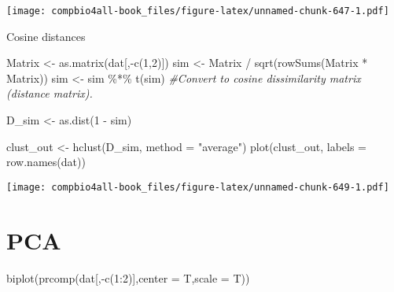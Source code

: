 \documentclass[
]{book}
\newenvironment{Shaded}{\begin{snugshade}}{\end{snugshade}}
\newcommand{\AttributeTok}[1]{\textcolor[rgb]{0.77,0.63,0.00}{#1}}
\newcommand{\CommentTok}[1]{\textcolor[rgb]{0.56,0.35,0.01}{\textit{#1}}}
\newcommand{\DecValTok}[1]{\textcolor[rgb]{0.00,0.00,0.81}{#1}}
\newcommand{\FunctionTok}[1]{\textcolor[rgb]{0.00,0.00,0.00}{#1}}
\newcommand{\NormalTok}[1]{#1}
\newcommand{\OtherTok}[1]{\textcolor[rgb]{0.56,0.35,0.01}{#1}}
\newcommand{\SpecialCharTok}[1]{\textcolor[rgb]{0.00,0.00,0.00}{#1}}
\newcommand{\StringTok}[1]{\textcolor[rgb]{0.31,0.60,0.02}{#1}}
\begin{document}
\texttt{[image: compbio4all-book\_files/figure-latex/unnamed-chunk-647-1.pdf]}

Cosine distances

\begin{Shaded}
\begin{Highlighting}[]
\NormalTok{Matrix }\OtherTok{\textless{}{-}} \FunctionTok{as.matrix}\NormalTok{(dat[,}\SpecialCharTok{{-}}\FunctionTok{c}\NormalTok{(}\DecValTok{1}\NormalTok{,}\DecValTok{2}\NormalTok{)])}
\NormalTok{sim }\OtherTok{\textless{}{-}}\NormalTok{ Matrix }\SpecialCharTok{/} \FunctionTok{sqrt}\NormalTok{(}\FunctionTok{rowSums}\NormalTok{(Matrix }\SpecialCharTok{*}\NormalTok{ Matrix))}
\NormalTok{sim }\OtherTok{\textless{}{-}}\NormalTok{ sim }\SpecialCharTok{\%*\%} \FunctionTok{t}\NormalTok{(sim)}
\CommentTok{\#Convert to cosine dissimilarity matrix (distance matrix).}

\NormalTok{D\_sim }\OtherTok{\textless{}{-}} \FunctionTok{as.dist}\NormalTok{(}\DecValTok{1} \SpecialCharTok{{-}}\NormalTok{ sim)}
\end{Highlighting}
\end{Shaded}

\begin{Shaded}
\begin{Highlighting}[]
\NormalTok{clust\_out }\OtherTok{\textless{}{-}} \FunctionTok{hclust}\NormalTok{(D\_sim,}
                    \AttributeTok{method =} \StringTok{"average"}\NormalTok{) }
\FunctionTok{plot}\NormalTok{(clust\_out,}
     \AttributeTok{labels =} \FunctionTok{row.names}\NormalTok{(dat))}
\end{Highlighting}
\end{Shaded}

\texttt{[image: compbio4all-book\_files/figure-latex/unnamed-chunk-649-1.pdf]}

\hypertarget{pca-1}{%
\section{PCA}\label{pca-1}}

\begin{Shaded}
\begin{Highlighting}[]
\FunctionTok{biplot}\NormalTok{(}\FunctionTok{prcomp}\NormalTok{(dat[,}\SpecialCharTok{{-}}\FunctionTok{c}\NormalTok{(}\DecValTok{1}\SpecialCharTok{:}\DecValTok{2}\NormalTok{)],}\AttributeTok{center =}\NormalTok{ T,}\AttributeTok{scale =}\NormalTok{ T))}
\end{Highlighting}
\end{Shaded}
\end{document}
